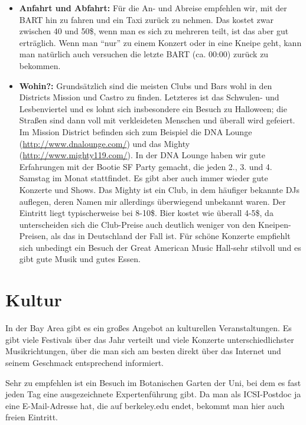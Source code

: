 \documentclass[a4paper]{scrreprt}
\begin{document}
\begin{itemize}

	\item \textbf{Anfahrt und Abfahrt:} Für die An- und Abreise empfehlen wir, mit der BART hin zu fahren und ein Taxi zurück zu nehmen. Das kostet zwar zwischen 40 und 50\$, wenn man es sich zu mehreren teilt, ist das aber gut erträglich. Wenn man "`nur"' zu einem Konzert oder in eine Kneipe geht, kann man natürlich auch versuchen die letzte BART (ca. 00:00) zurück zu bekommen.

	\item \textbf{Wohin?:} Grundsätzlich sind die meisten Clubs und Bars wohl in den Districts Mission und Castro zu finden. Letzteres ist das Schwulen- und Lesbenviertel und es lohnt sich insbesondere ein Besuch zu Halloween; die Straßen sind dann voll mit verkleideten Menschen und überall wird gefeiert. Im Mission District befinden sich zum Beispiel die DNA Lounge (\url{http://www.dnalounge.com/}) und das Mighty (\url{http://www.mighty119.com/}). In der DNA Lounge haben wir gute Erfahrungen mit der Bootie SF Party gemacht, die jeden 2., 3. und 4. Samstag im Monat stattfindet. Es gibt aber auch immer wieder gute Konzerte und Shows. Das Mighty ist ein Club, in dem häufiger bekannte DJs auflegen, deren Namen mir allerdings überwiegend unbekannt waren. Der Eintritt liegt typischerweise bei 8-10\$. Bier kostet wie überall 4-5\$, da unterscheiden sich die Club-Preise auch deutlich weniger von den Kneipen-Preisen, als das in Deutschland der Fall ist. Für schöne Konzerte empfiehlt sich unbedingt ein Besuch der Great American Music Hall-sehr stilvoll und es gibt gute Musik und gutes Essen.

\end{itemize}

\section{Kultur}

In der Bay Area gibt es ein großes Angebot an kulturellen Veranstaltungen. Es gibt viele Festivals über das Jahr verteilt und viele Konzerte unterschiedlichster Musikrichtungen, über die man sich am besten direkt über das Internet und seinem Geschmack entsprechend informiert.

Sehr zu empfehlen ist ein Besuch im Botanischen Garten der Uni, bei dem es fast jeden Tag eine ausgezeichnete Expertenführung gibt. Da man als ICSI-Postdoc ja eine E-Mail-Adresse hat, die auf berkeley.edu endet, bekommt man hier auch freien Eintritt.
\end{document}
